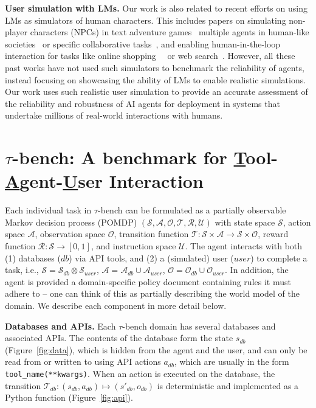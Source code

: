 \documentclass{article}
\newcommand{\benchmark}{$\tau$-bench}
\begin{document}
\textbf{User simulation with LMs.} Our work is also related to recent efforts on using LMs as simulators of human characters. This includes papers on simulating non-player characters (NPCs) in text adventure games~\cite{kim2022plm}  multiple agents in human-like societies~\cite{park2023generative} or specific collaborative tasks~\cite{wu2023autogen}, and enabling human-in-the-loop interaction for tasks like online shopping~~\cite{chen2024chatshop} or web search~\cite{zhang2024usimagent}. However,  all these past works have not used such simulators to benchmark the reliability of agents, instead focusing on showcasing the ability of LMs to enable realistic simulations. Our work uses such realistic user simulation to provide an accurate assessment of the reliability and robustness of AI agents for deployment in systems that undertake millions of real-world interactions with humans. 


\section{\texorpdfstring{\benchmark{}: A benchmark for \underline{T}ool-\underline{A}gent-\underline{U}ser Interaction}{TAU-bench: A benchmark for Tool-Agent-User Interaction}}


Each individual task in \benchmark{} can be formulated as a partially observable Markov decision process (POMDP) $(\mathcal{S}, \mathcal{A}, \mathcal{O}, \mathcal{T}, \mathcal{R}, \mathcal{U})$ with state space $\mathcal{S}$, action space $\mathcal{A}$, observation space $\mathcal{O}$, transition function $\mathcal{T}: \mathcal{S} \times \mathcal{A} \to \mathcal{S} \times \mathcal{O}$, reward function $\mathcal{R}: \mathcal{S} \to [0, 1]$, and instruction space $\mathcal{U}$. The agent interacts with both (1) databases ($db$) via API tools, and (2) a (simulated) user ($user$) to complete a task, i.e., $\mathcal{S}=\mathcal{S}_{db} \otimes \mathcal{S}_{user}$, $\mathcal{A} = \mathcal{A}_{db} \cup \mathcal{A}_{user}$, $\mathcal{O} = \mathcal{O}_{db} \cup \mathcal{O}_{user}$. In addition, the agent is provided a domain-specific policy document containing rules it must adhere to -- one can think of this as partially describing the world model of the domain. We describe each component in more detail below.


\textbf{Databases and APIs.} Each \benchmark{} domain has several databases and associated APIs. The contents of the database form the state ${s}_{db}$ (Figure~\ref{fig:data}), which is hidden from the agent and the user, and can only be read from or written to using API actions ${a}_{db}$, which are usually in the form \texttt{tool\_name(**kwargs)}. When an action is executed on the database, the transition $\mathcal{T}_{db}: (s_{db}, a_{db}) \mapsto (s'_{db}, o_{db})$ is deterministic and implemented as a Python function (Figure~\ref{fig:api}). 
\end{document}
